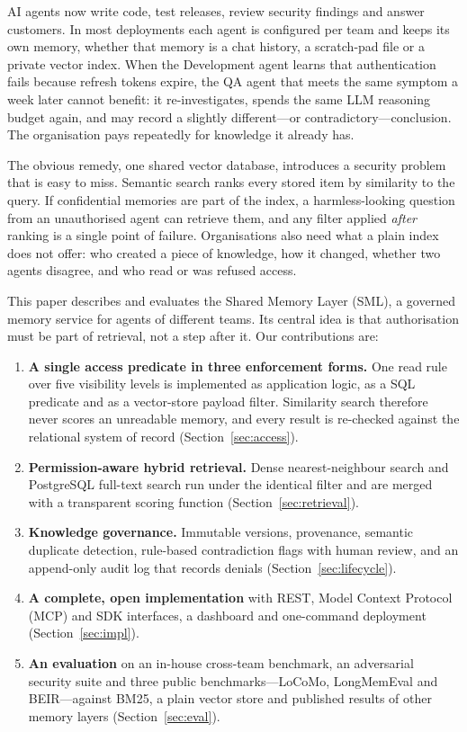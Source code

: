 \documentclass[11pt,a4paper]{article}
\newcommand{\sys}{SML}
\begin{document}
AI agents now write code, test releases, review security findings and answer customers. In most
deployments each agent is configured per team and keeps its own memory, whether that memory is a chat
history, a scratch-pad file or a private vector index. When the Development agent learns that
authentication fails because refresh tokens expire, the QA agent that meets the same symptom a week later
cannot benefit: it re-investigates, spends the same LLM reasoning budget again, and may record a slightly
different---or contradictory---conclusion. The organisation pays repeatedly for knowledge it already has.

The obvious remedy, one shared vector database, introduces a security problem that is easy to miss.
Semantic search ranks every stored item by similarity to the query. If confidential memories are part of
the index, a harmless-looking question from an unauthorised agent can retrieve them, and any filter applied
\emph{after} ranking is a single point of failure. Organisations also need what a plain index does not
offer: who created a piece of knowledge, how it changed, whether two agents disagree, and who read or was
refused access.

This paper describes and evaluates the Shared Memory Layer (\sys{}), a governed memory service for agents
of different teams. Its central idea is that authorisation must be part of retrieval, not a step after it.
Our contributions are:
\begin{enumerate}[leftmargin=*]
  \item \textbf{A single access predicate in three enforcement forms.} One read rule over five visibility
  levels is implemented as application logic, as a SQL predicate and as a vector-store payload filter.
  Similarity search therefore never scores an unreadable memory, and every result is re-checked against
  the relational system of record (Section~\ref{sec:access}).
  \item \textbf{Permission-aware hybrid retrieval.} Dense nearest-neighbour search and PostgreSQL full-text
  search run under the identical filter and are merged with a transparent scoring function
  (Section~\ref{sec:retrieval}).
  \item \textbf{Knowledge governance.} Immutable versions, provenance, semantic duplicate detection,
  rule-based contradiction flags with human review, and an append-only audit log that records denials
  (Section~\ref{sec:lifecycle}).
  \item \textbf{A complete, open implementation} with REST, Model Context Protocol (MCP) and SDK interfaces,
  a dashboard and one-command deployment (Section~\ref{sec:impl}).
  \item \textbf{An evaluation} on an in-house cross-team benchmark, an adversarial security suite and three
  public benchmarks---LoCoMo, LongMemEval and BEIR---against BM25, a plain vector store and published
  results of other memory layers (Section~\ref{sec:eval}).
\end{enumerate}
\end{document}
